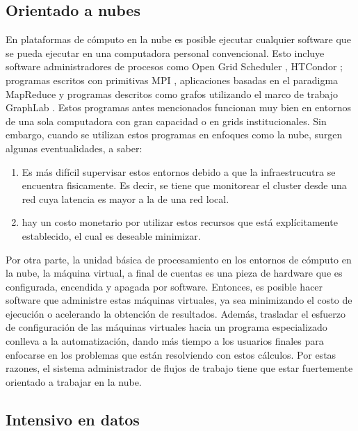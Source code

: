 \subsection{Orientado a nubes}

En plataformas de c\'omputo en la nube es posible ejecutar cualquier software que se pueda ejecutar en una computadora personal convencional. Esto incluye software administradores de procesos como Open Grid Scheduler \cite{univa2016gridengine}, HTCondor \cite{htcondor2014webpage}; programas escritos con primitivas MPI \cite{mpiforum2016mpi}, aplicaciones basadas en el paradigma MapReduce \cite{dean2008mapreduce} y programas descritos como grafos utilizando el marco de trabajo GraphLab \cite{low2014graphlab}. Estos programas antes mencionados funcionan muy bien en entornos de una sola computadora con gran capacidad o en grids institucionales. Sin embargo, cuando se utilizan estos programas en enfoques como la nube, surgen algunas eventualidades, a saber:

\begin{enumerate}
\item Es más difícil supervisar estos entornos debido a que la infraestrucutra se encuentra fisicamente. Es decir, se tiene que monitorear el cluster desde una red cuya latencia es mayor a la de una red local. 

\item hay un costo monetario por utilizar estos recursos que está explícitamente establecido, el cual es deseable minimizar. 
\end{enumerate}

Por otra parte, la unidad b\'asica de procesamiento en los entornos de c\'omputo en la nube, la m\'aquina virtual, a final de cuentas es una pieza de hardware que es configurada, encendida y apagada por software. Entonces, es posible hacer software que administre estas m\'aquinas virtuales, ya sea minimizando el costo de ejecuci\'on o acelerando la obtenci\'on de resultados. Adem\'as, trasladar el esfuerzo de configuraci\'on de las m\'aquinas virtuales hacia un programa especializado conlleva a la automatizaci\'on, dando m\'as tiempo a los usuarios finales para enfocarse en los problemas que est\'an resolviendo con estos c\'alculos. Por estas razones, el sistema administrador de flujos de trabajo tiene que estar fuertemente orientado a trabajar en la nube.


\subsection{Intensivo en datos}

